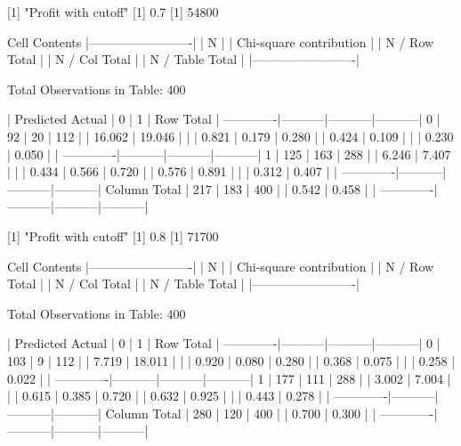 \documentclass{article}
\begin{document}
\begin{Schunk}
\begin{Soutput}
 
[1] "Profit with cutoff"
[1] 0.7
[1] 54800

 
   Cell Contents
|-------------------------|
|                       N |
| Chi-square contribution |
|           N / Row Total |
|           N / Col Total |
|         N / Table Total |
|-------------------------|

 
Total Observations in Table:  400 

 
             | Predicted 
      Actual |         0 |         1 | Row Total | 
-------------|-----------|-----------|-----------|
           0 |        92 |        20 |       112 | 
             |    16.062 |    19.046 |           | 
             |     0.821 |     0.179 |     0.280 | 
             |     0.424 |     0.109 |           | 
             |     0.230 |     0.050 |           | 
-------------|-----------|-----------|-----------|
           1 |       125 |       163 |       288 | 
             |     6.246 |     7.407 |           | 
             |     0.434 |     0.566 |     0.720 | 
             |     0.576 |     0.891 |           | 
             |     0.312 |     0.407 |           | 
-------------|-----------|-----------|-----------|
Column Total |       217 |       183 |       400 | 
             |     0.542 |     0.458 |           | 
-------------|-----------|-----------|-----------|

 
[1] "Profit with cutoff"
[1] 0.8
[1] 71700

 
   Cell Contents
|-------------------------|
|                       N |
| Chi-square contribution |
|           N / Row Total |
|           N / Col Total |
|         N / Table Total |
|-------------------------|

 
Total Observations in Table:  400 

 
             | Predicted 
      Actual |         0 |         1 | Row Total | 
-------------|-----------|-----------|-----------|
           0 |       103 |         9 |       112 | 
             |     7.719 |    18.011 |           | 
             |     0.920 |     0.080 |     0.280 | 
             |     0.368 |     0.075 |           | 
             |     0.258 |     0.022 |           | 
-------------|-----------|-----------|-----------|
           1 |       177 |       111 |       288 | 
             |     3.002 |     7.004 |           | 
             |     0.615 |     0.385 |     0.720 | 
             |     0.632 |     0.925 |           | 
             |     0.443 |     0.278 |           | 
-------------|-----------|-----------|-----------|
Column Total |       280 |       120 |       400 | 
             |     0.700 |     0.300 |           | 
-------------|-----------|-----------|-----------|


\end{Soutput}
\end{Schunk}
\end{document}
